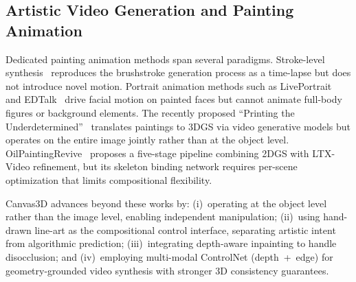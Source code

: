 \subsection{Artistic Video Generation and Painting Animation}

Dedicated painting animation methods span several paradigms.
Stroke-level synthesis~\cite{zou2021stylized,liu2021neuralstrokes}
reproduces the brushstroke generation process as a time-lapse but does not
introduce novel motion. Portrait animation methods such as
LivePortrait~\cite{guo2024liveportrait} and EDTalk~\cite{tan2024edtalk}
drive facial motion on painted faces but cannot animate full-body figures
or background elements. The recently proposed ``Printing the
Underdetermined''~\cite{ming2026printing} translates paintings to 3DGS via video
generative models but operates on the entire image jointly rather than at the
object level. OilPaintingRevive~\cite{oilpaintingrevive2026} proposes a
five-stage pipeline combining 2DGS with LTX-Video refinement, but its skeleton
binding network requires per-scene optimization that limits compositional
flexibility.

Canvas3D advances beyond these works by: (i)~operating at the object level
rather than the image level, enabling independent manipulation; (ii)~using
hand-drawn line-art as the compositional control interface, separating artistic
intent from algorithmic prediction; (iii)~integrating depth-aware inpainting to
handle disocclusion; and (iv)~employing multi-modal ControlNet (depth~+~edge)
for geometry-grounded video synthesis with stronger 3D consistency guarantees.
